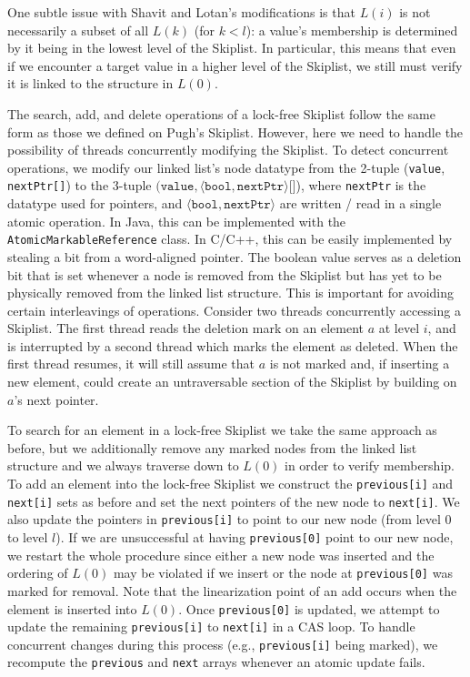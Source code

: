 \documentclass{acm_proc_article-sp}
\begin{document}
One subtle issue with Shavit and Lotan's modifications is that $L(i)$ is not necessarily a subset
of all $L(k)$ (for $k < l$): a value's membership is determined by it being
in the lowest level of the Skiplist.
In particular, this means that even if we encounter
a target value in a higher level of the Skiplist, we still must verify it is
linked to the structure in $L(0)$. 

The search, add, and delete operations of a lock-free Skiplist follow the same form as
those we defined on Pugh's Skiplist.
However, here we need to handle the possibility of threads
concurrently modifying the Skiplist. To detect concurrent operations, we
modify our linked list's node datatype from the 2-tuple (\texttt{value}, \texttt{nextPtr[]}) to
the 3-tuple $(\texttt{value}, \allowbreak \langle \texttt{bool}, \allowbreak \texttt{nextPtr} \rangle\texttt{[]}$),
where \texttt{nextPtr} is the datatype used for pointers, and $\langle \texttt{bool}, \allowbreak \texttt{nextPtr} \rangle$
are written / read in a single atomic operation. In Java, this can be implemented
with the \texttt{AtomicMarkableReference} class.
In C/C++, this can be easily implemented by stealing a bit from a word-aligned pointer.
The boolean value serves as a deletion bit that is set whenever a node is removed
from the Skiplist but has yet to be physically removed from the linked list structure. This is
important for avoiding certain interleavings of operations. Consider two threads concurrently accessing
a Skiplist. The first thread reads the deletion mark on an element $a$ at level $i$, and is
interrupted by a second thread which marks the element as deleted. When the first thread resumes,
it will still assume that $a$ is not marked and, if inserting a new element,
could create an untraversable section of the
Skiplist by building on $a$'s next pointer.

To search for an element in a lock-free Skiplist we take the same approach as before, but
we additionally remove any marked nodes from the linked list structure and we always traverse
down to $L(0)$ in order to verify membership. To add an element
into the lock-free Skiplist we construct the \texttt{previous[i]} and \texttt{next[i]} sets
as before and set the next pointers of the new node to \texttt{next[i]}. We also update the
pointers in \texttt{previous[i]} to point to our new node (from level $0$ to level $l$).
If we are unsuccessful at having \texttt{previous[0]} point to our new node, we restart the
whole procedure since either a new node was inserted and the ordering of $L(0)$ may be violated
if we insert or the node at \texttt{previous[0]} was marked for removal.
Note that the linearization point of an add occurs when the element is inserted
into $L(0)$. Once \texttt{previous[0]} is updated, we attempt to update the remaining
\texttt{previous[i]} to \texttt{next[i]} in a CAS loop. To handle concurrent changes
during this process (e.g., \texttt{previous[i]} being marked), we recompute the \texttt{previous}
and \texttt{next} arrays whenever an atomic update fails.
\end{document}
